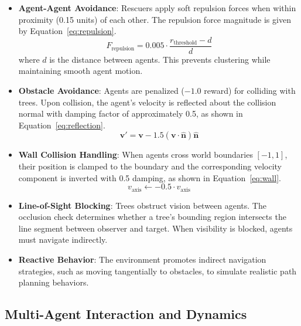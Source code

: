 \documentclass[11pt,a4paper]{article}
\begin{document}
\begin{itemize}
    \item \textbf{Agent-Agent Avoidance}: Rescuers apply soft repulsion forces when within proximity (0.15 units) of each other.
    The repulsion force magnitude is given by Equation~\ref{eq:repulsion}.
    \begin{equation}
    \label{eq:repulsion}
    F_{\text{repulsion}} = 0.005 \cdot \frac{r_{\text{threshold}} - d}{d}
    \end{equation}
    where $d$ is the distance between agents.
    This prevents clustering while maintaining smooth agent motion.

    \item \textbf{Obstacle Avoidance}: Agents are penalized ($-1.0$ reward) for colliding with trees.
    Upon collision, the agent's velocity is reflected about the collision normal with damping factor of approximately 0.5, as shown in Equation~\ref{eq:reflection}.
    \begin{equation}
    \label{eq:reflection}
    \mathbf{v}' = \mathbf{v} - 1.5(\mathbf{v} \cdot \hat{\mathbf{n}})\hat{\mathbf{n}}
    \end{equation}

    \item \textbf{Wall Collision Handling}: When agents cross world boundaries $[-1, 1]$, their position is clamped to the boundary and the corresponding velocity component is inverted with 0.5 damping, as shown in Equation~\ref{eq:wall}.
    \begin{equation}
    \label{eq:wall}
    v_{\text{axis}} \leftarrow -0.5 \cdot v_{\text{axis}}
    \end{equation}

    \item \textbf{Line-of-Sight Blocking}: Trees obstruct vision between agents.
    The occlusion check determines whether a tree's bounding region intersects the line segment between observer and target.
    When visibility is blocked, agents must navigate indirectly.

    \item \textbf{Reactive Behavior}: The environment promotes indirect navigation strategies, such as moving tangentially to obstacles, to simulate realistic path planning behaviors.
\end{itemize}

\subsection{Multi-Agent Interaction and Dynamics}
\label{subsec:multi_agent}
\end{document}
